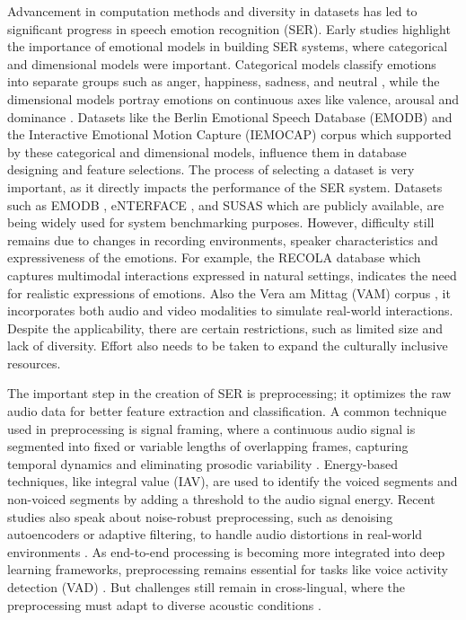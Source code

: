 \documentclass[iicol,sn-mathphys-num]{sn-jnl}%
\theoremstyle{thmstyleone}%
\theoremstyle{thmstyletwo}%
\theoremstyle{thmstylethree}%
\begin{document}
Advancement in computation methods and diversity in datasets has led to significant progress in speech emotion recognition (SER). Early studies highlight the importance of emotional models in building SER systems, where categorical and dimensional models were important. Categorical models classify emotions into separate groups such as anger, happiness, sadness, and neutral \cite{r5}, while the dimensional models portray emotions on continuous axes like valence, arousal and dominance \cite{r1}. Datasets like the Berlin Emotional Speech Database (EMODB) \cite{r4} and the Interactive Emotional Motion Capture (IEMOCAP) corpus \cite{r3} which supported by these categorical and dimensional models, influence them in database designing and feature selections. The process of selecting a dataset is very important, as it directly impacts the performance of the SER system. Datasets such as EMODB \cite{r4}, eNTERFACE \cite{r7}, and SUSAS \cite{r6} which are publicly available, are being widely used for system benchmarking purposes. However, difficulty still remains due to changes in recording environments, speaker characteristics and expressiveness of the emotions. For example, the RECOLA database \cite{r2} which captures multimodal interactions expressed in natural settings, indicates the need for realistic expressions of emotions. Also the Vera am Mittag (VAM) corpus \cite{r8}, it incorporates both audio and video modalities to simulate real-world interactions. Despite the applicability, there are certain restrictions, such as limited size and lack of diversity. Effort also needs to be taken to expand the culturally inclusive resources. 


The important step in the creation of SER is preprocessing; it optimizes the raw audio data for better feature extraction and classification. A common technique used in preprocessing is signal framing, where a continuous audio signal is segmented into fixed or variable lengths of overlapping frames, capturing temporal dynamics and eliminating prosodic variability  \cite{r4}\cite{r9}. Energy-based techniques, like integral value (IAV), are used to identify the voiced segments and non-voiced segments by adding a threshold to the audio signal energy. Recent studies also speak about noise-robust preprocessing, such as denoising autoencoders or adaptive filtering, to handle audio distortions in real-world environments \cite{r2}. As end-to-end processing is becoming more integrated into deep learning frameworks, preprocessing remains essential for tasks like voice activity detection (VAD) \cite{r6}. But challenges still remain in cross-lingual, where the preprocessing must adapt to diverse acoustic conditions \cite{r4}.
\end{document}
